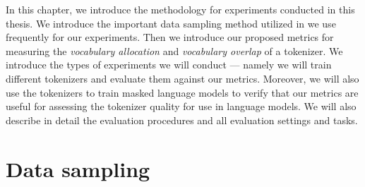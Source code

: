 In this chapter, we introduce the methodology for experiments conducted in this thesis. We introduce the important data sampling method utilized in \citet{devlin_bert_2019,conneau_unsupervised_2020} we use frequently for our experiments. Then we introduce our proposed metrics for measuring the \textit{vocabulary allocation} and \textit{vocabulary overlap} of a tokenizer. We introduce the types of experiments we will conduct --- namely we will train different tokenizers and evaluate them against our metrics. Moreover, we will also use the tokenizers to train masked language models to verify that our metrics are useful for assessing the tokenizer quality for use in language models. We will also describe in detail the evaluation procedures and all evaluation settings and tasks. 





\section{Data sampling}



